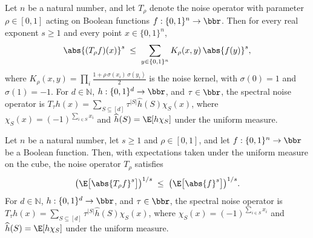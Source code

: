 \begin{lemma}
\leanok
{}
\label{BooleanAnalysis.Hypercontractivity.noiseOp_abs_rpow_le_kernel_avg}
Let $n$ be a natural number, and let $T_\rho$ denote the noise operator with parameter
$\rho \in [0,1]$ acting on Boolean functions $f : \{0,1\}^n \to \bbr$. Then for every
real exponent $s \ge 1$ and every point $x \in \{0,1\}^n$,
\[
  \abs{(T_\rho f)(x)}^{s} \;\le\; \sum_{y \in \{0,1\}^n} K_\rho(x,y)\,\abs{f(y)}^{s},
\]
where $K_\rho(x,y) = \prod_{i} \tfrac{1 + \rho\,\sigma(x_i)\,\sigma(y_i)}{2}$ is the
noise kernel, with $\sigma(0)=1$ and $\sigma(1)=-1$. For $d\in\mathbb N$,
$h:\{0,1\}^d\to\bbr$, and $\tau\in\bbr$, the spectral noise operator is $T_\tau
h(x)=\sum_{S\subseteq[d]}\tau^{|S|}\widehat h(S)\chi_S(x)$, where
$\chi_S(x)=(-1)^{\sum_{i\in S}x_i}$ and $\widehat h(S)=\E[h\chi_S]$ under the uniform
measure.
\end{lemma}

\begin{lemma}
\leanok
{}
\label{BooleanAnalysis.Hypercontractivity.trivial_contractivity}
Let $n$ be a natural number, let $s \ge 1$ and $\rho \in [0,1]$, and let $f : \{0,1\}^n
\to \bbr$ be a Boolean
function. Then, with expectations taken under the uniform measure on the cube, the noise
operator $T_\rho$ satisfies
\[
  \bigl(\E\bigl[\abs{T_\rho f}^{s}\bigr]\bigr)^{1/s}
  \;\le\;
  \bigl(\E\bigl[\abs{f}^{s}\bigr]\bigr)^{1/s}.
\] For $d\in\mathbb N$, $h:\{0,1\}^d\to\bbr$, and $\tau\in\bbr$, the spectral noise
operator is $T_\tau h(x)=\sum_{S\subseteq[d]}\tau^{|S|}\widehat h(S)\chi_S(x)$, where
$\chi_S(x)=(-1)^{\sum_{i\in S}x_i}$ and $\widehat h(S)=\E[h\chi_S]$ under the uniform
measure.
\end{lemma}

